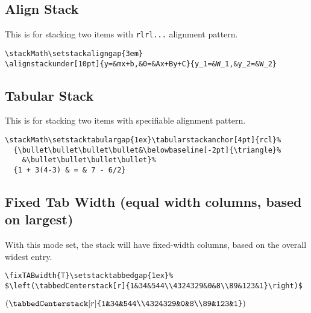 \documentclass{article}
\begin{document}
\subsection*{Align Stack}

This is for stacking two items with \texttt{rlrl...} alignment pattern.

\verb|\stackMath\setstackaligngap{3em}|\\
\verb|\alignstackunder[10pt]{y=&mx+b,&0=&Ax+By+C}{y_1=&W_1,&y_2=&W_2}|

{\small\stackMath\setstackaligngap{3em}
}

\clearpage
\subsection*{Tabular Stack}

This is for stacking two items with specifiable alignment pattern.

\verb|\stackMath\setstacktabulargap{1ex}\tabularstackanchor[4pt]{rcl}%|\\
\verb|  {\bullet\bullet\bullet\bullet&\belowbaseline[-2pt]{\triangle}%|\\
\verb|    &\bullet\bullet\bullet\bullet}%|\\
\verb|  {1 + 3(4-3) & = & 7 - 6/2}|\vspace{1ex}

{\small\stackMath\setstacktabulargap{1ex}
}

\subsection*{Fixed Tab Width (equal width columns, based on largest)}

With this mode set, the stack will have fixed-width columns, based on the overall
widest entry.

\verb|\fixTABwidth{T}\setstacktabbedgap{1ex}%|\\
\verb|$\left(\tabbedCenterstack[r]{1&34&544\\4324329&0&8\\89&123&1}\right)$|

{\small\setstacktabbedgap{1ex}$\left(\tabbedCenterstack[r]{1&34&544\\4324329&0&8\\89&123&1}\right)$}
\end{document}
